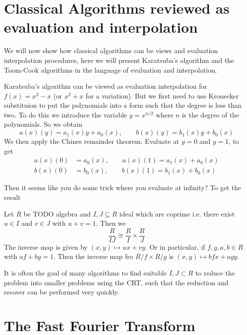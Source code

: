 \section{Classical Algorithms reviewed as evaluation and interpolation}%
\label{sec:classical_algorithms_reviewed_as_evaluation_and_interpolation}

We will now show how classical algorithms can be views and evaluation interpolation procedures, here we will present Karatsuba's algorithm and the Toom-Cook algorithms in the language of evaluation and interpolation.

Karatsuba's algorithm can be viewed as evaluation interpolation for $f(x) = x^2 - x$ (or $x^2 + x$ for a variation). But we first need to use Kronecker substituion to put the polynomials into a form such that the degree is less than two. To do this we introduce the variable $y = x^{n/2}$ where $n$ is the degree of the polynomials. So we obtain
\[
    a(x)(y) = a_1(x)y + a_0(x), \qquad b(x)(y) = b_1(x)y + b_0(x)
\]
We then apply the Chines remainder theorem. Evaluate at $y = 0$ and $y = 1$, to get
\begin{align*}
    a(x)(0) &= a_0(x), \qquad a(x)(1) = a_1(x) + a_0(x)\\
    b(x)(0) &= b_0(x), \qquad b(x)(1) = b_1(x) + b_0(x)
\end{align*}

Then it seems like you do some trick where you evaluate at infinity? To get the result

\begin{theorem}
    Let $R$ be TODO algebra and $I, J \subseteq R$ ideal which are coprime i.e. there exist $u \in I$ and $v \in J$ with $u + v = 1$. Then we
    \[
        \frac{R}{IJ} \cong \frac{R}{I} \times \frac{R}{J}
    \]
    The inverse map is given by $(x, y) \mapsto ux + vy$. Or in particular, if $f, g, a, b \in R$ with $af + bg = 1$. Then the inverse map fro $R/f \times R/g$ is $(x, y) \mapsto bfx + agy$.
\end{theorem}

It is often the goal of many algorithms to find suitable $I, J \subset R$ to reduce the problem into smaller problems using the CRT, such that the reduction and recover can be performed very quickly.

\section{The Fast Fourier Transform}

